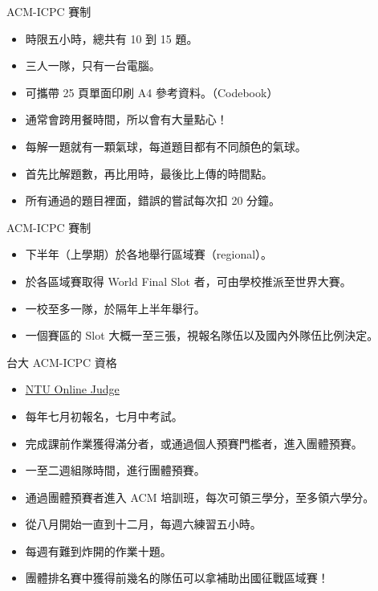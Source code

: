 \documentclass[t]{beamer}
\begin{document}
\begin{frame}{ACM-ICPC 賽制}
  \begin{itemize}
    \item 時限五小時，總共有 10 到 15 題。
    \item 三人一隊，只有一台電腦。
    \item 可攜帶 25 頁單面印刷 A4 參考資料。（Codebook）
    \item 通常會跨用餐時間，所以會有大量點心！
    \item 每解一題就有一顆氣球，每道題目都有不同顏色的氣球。
    \item 首先比解題數，再比用時，最後比上傳的時間點。
    \item 所有通過的題目裡面，錯誤的嘗試每次扣 20 分鐘。
  \end{itemize}
\end{frame}

\begin{frame}{ACM-ICPC 賽制}
  \begin{itemize}
    \item 下半年（上學期）於各地舉行區域賽（regional）。
    \item 於各區域賽取得 World Final Slot 者，可由學校推派至世界大賽。
    \item 一校至多一隊，於隔年上半年舉行。
    \item 一個賽區的 Slot 大概一至三張，視報名隊伍以及國內外隊伍比例決定。
  \end{itemize}
\end{frame}

\begin{frame}{台大 ACM-ICPC 資格}
  \begin{itemize}
    \item \href{http://acm.csie.org/ntujudge/index.php}{\underline{NTU Online Judge}}
    \item 每年七月初報名，七月中考試。
    \item 完成課前作業獲得滿分者，或通過個人預賽門檻者，進入團體預賽。
    \item 一至二週組隊時間，進行團體預賽。
    \item 通過團體預賽者進入 ACM 培訓班，每次可領三學分，至多領六學分。
    \item 從八月開始一直到十二月，每週六練習五小時。
    \item 每週有難到炸開的作業十題。
    \item 團體排名賽中獲得前幾名的隊伍可以拿補助出國征戰區域賽！
  \end{itemize}
\end{frame}
\end{document}
